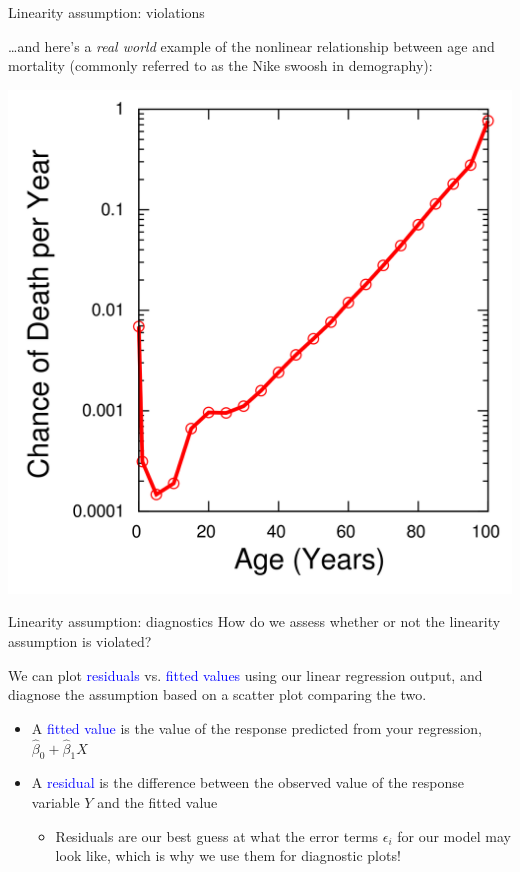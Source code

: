 \documentclass[10pt,t]{beamer}
\begin{document}
\begin{frame}{Linearity assumption: violations}

\dots and here's a \textit{real world} example of the nonlinear relationship between age and mortality (commonly referred to as the Nike swoosh in demography):

\vspace{0.3cm}

\centering \includegraphics[scale=0.1]{figures/mortality_curve.png}

\end{frame}

\begin{frame}{Linearity assumption: diagnostics}
How do we assess whether or not the linearity assumption is violated?

\vspace{0.3cm}

We can plot \textcolor{blue}{residuals} vs. \textcolor{blue}{fitted values} using our linear regression output, and diagnose the assumption based on a scatter plot comparing the two.

\vspace{0.3cm}

\begin{itemize}
	\item A \textcolor{blue}{fitted value} is the value of the response predicted from your regression, $\hat{\beta}_0 + \hat{\beta}_1 X$
	\medskip
	\item A \textcolor{blue}{residual} is the difference between the observed value of the response variable $Y$ and the fitted value
	\medskip
	\begin{itemize}
		\item[] Residuals are our best guess at what the error terms $\epsilon_i$ for our model may look like, which is why we use them for diagnostic plots!
	\end{itemize}
\end{itemize}
\end{frame}
\end{document}
